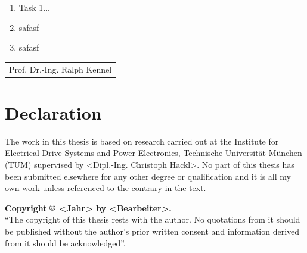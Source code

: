 \begin{enumerate}
\item Task 1...
\item {\small safasf}{\small \par}
\item {\small safasf}{\small \par}
\end{enumerate}
\hfill\begin{tabular}{c}
\hfill\tabularnewline
\hline
Prof. Dr.-Ing. Ralph Kennel\tabularnewline
\end{tabular}


\chapter*{Declaration}

 The work
in this thesis is based on research carried out at the Institute for
Electrical Drive Systems and Power Electronics, Technische Universität München (TUM) supervised
by <Dipl.-Ing. Christoph Hackl>. No part of this thesis has been submitted
elsewhere for any other degree or qualification and it is all my own
work unless referenced to the contrary in the text.\vspace{2in}

\vfill{}
\noindent \textbf{Copyright} $\mathbf{\copyright}$ \textbf{<Jahr>
by <Bearbeiter>.}\\
 {}``The copyright of this thesis rests with the author. No quotations
from it should be published without the author's prior written consent
and information derived from it should be acknowledged''.

\newpage

\mbox{}

\thispagestyle{empty}


\tableofcontents{}

\newpage

\mbox{}

\thispagestyle{empty}

\listoffigures


\newpage

\mbox{}

\thispagestyle{empty}

\listoftables

